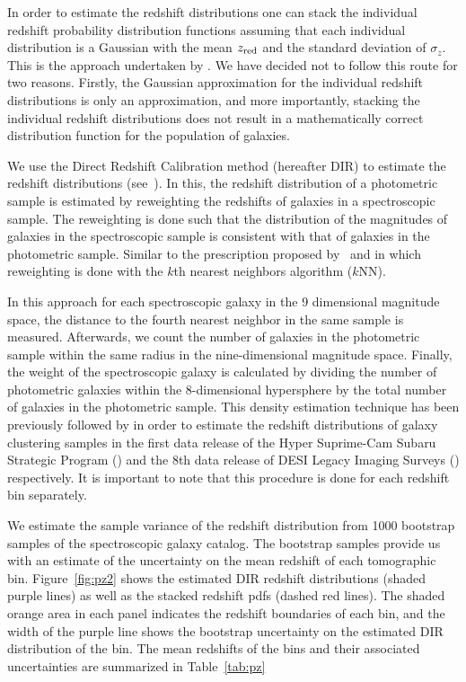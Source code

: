 \documentclass[fleqn,usenatbib,useAMS]{mnras}
\begin{document}
In order to estimate the redshift distributions one can stack the individual redshift probability distribution functions assuming that each individual distribution is a Gaussian with the mean $z_{\rm red}$ and the standard deviation of $\sigma_{z}$. This is the approach undertaken by \citet{elvin2017}. We have decided not to follow this route for two reasons. Firstly, the Gaussian approximation for the individual redshift distributions is only an approximation, and more importantly, stacking the individual redshift distributions does not result in a mathematically correct distribution function for the population of galaxies. 

We use the Direct Redshift Calibration method (hereafter DIR) to estimate the redshift distributions (see~\citealt{lima2008, cunha2009}). In this, the redshift distribution of a photometric sample is estimated by reweighting the redshifts of galaxies in a spectroscopic sample. The reweighting is done such that the distribution of the magnitudes of galaxies in the spectroscopic sample is consistent with that of galaxies in the photometric sample. Similar to the prescription proposed by~\citealt{cunha2009} and \citealt{hendrik2018} in which reweighting is done with the $k$th nearest neighbors algorithm ($k$NN). 

In this approach for each spectroscopic galaxy in the 9 dimensional magnitude space, the distance to the fourth nearest neighbor in the same sample is measured. Afterwards, we count the number of galaxies in the photometric sample within the same radius in the nine-dimensional magnitude space. Finally, the weight of the spectroscopic galaxy is calculated by dividing the number of photometric galaxies within the 8-dimensional hypersphere by the total number of galaxies in the photometric sample. This density estimation technique has been previously followed by \citealt{nicola2019, zhou2020} in order to estimate the redshift distributions of galaxy clustering samples in the first data release of the Hyper Suprime-Cam Subaru Strategic Program (\citealt{hsc_dr1}) and the 8th data release of DESI Legacy Imaging Surveys (\citealt{desi_legacy}) respectively.   
It is important to note that this procedure is done for each redshift bin separately.

We estimate the sample variance of the redshift distribution from 1000 bootstrap samples of the spectroscopic galaxy catalog. The bootstrap samples provide us with an estimate of the uncertainty on the mean redshift of each tomographic bin. Figure~\ref{fig:pz2} shows the estimated DIR redshift distributions (shaded purple lines) as well as the stacked redshift pdfs (dashed red lines). The shaded orange area in each panel indicates the redshift boundaries of each bin, and the width of the purple line shows the bootstrap uncertainty on the estimated DIR distribution of the bin. The mean redshifts of the bins and their associated uncertainties are summarized in Table~\ref{tab:pz}
\end{document}
